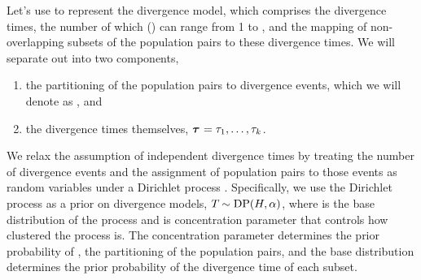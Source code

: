 Let's use \divtimemodel to represent the divergence model, which comprises
the divergence times, the number of which (\nevents{}) can range from 1 to
\ncomparisons{}, and the mapping of non-overlapping subsets of the population
pairs to these \nevents{} divergence times.
We will separate out \divtimemodel into two components,
\begin{enumerate}
    \item the partitioning of the \ncomparisons{} population pairs to
        divergence events, which we will denote as \divtimesets, and
    \item the divergence times themselves,
        $\divtimes = \divtime[1], \ldots, \divtime[\nevents]$.
\end{enumerate}
We relax the assumption of independent divergence times by treating the number
of divergence events and the assignment of population pairs to those events as
random variables under a Dirichlet process \citep{Ferguson1973,
    Antoniak1974}.
Specifically, we use the Dirichlet process as a prior on divergence models,
$\divtimemodel \sim \dirp(\basedistribution, \concentration)$, where
\basedistribution is the base distribution of the process and \concentration is
concentration parameter that controls how clustered the process is.
The concentration parameter determines the prior probability of \divtimesets,
the partitioning of the population pairs, and the base distribution determines
the prior probability of the divergence time of each subset.

